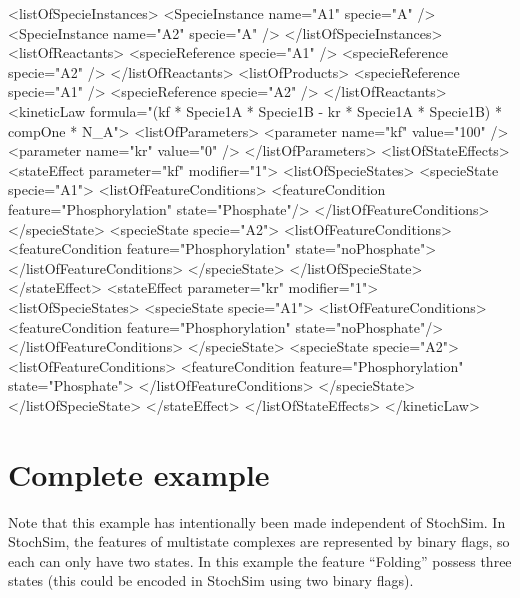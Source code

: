 \documentclass{cekarticle}
\begin{document}
\begin{example}
<listOfSpecieInstances>
    <SpecieInstance name="A1" specie="A" />
    <SpecieInstance name="A2" specie="A" />
</listOfSpecieInstances>
<listOfReactants>
    <specieReference specie="A1" />
    <specieReference specie="A2" />
</listOfReactants>
<listOfProducts>
    <specieReference specie="A1" />
    <specieReference specie="A2" />
</listOfReactants>
<kineticLaw formula="(kf * Specie1A * Specie1B - kr * Specie1A * Specie1B) * compOne * N_A">
    <listOfParameters>
        <parameter name="kf" value="100" />
        <parameter name="kr" value="0" />
    </listOfParameters>
    <listOfStateEffects>
        <stateEffect parameter="kf" modifier="1">
            <listOfSpecieStates>
                <specieState specie="A1">
                    <listOfFeatureConditions>
                        <featureCondition feature="Phosphorylation" state="Phosphate"/>
                    </listOfFeatureConditions>
                </specieState>
                <specieState specie="A2">
                    <listOfFeatureConditions>
                        <featureCondition feature="Phosphorylation" state="noPhosphate">
                    </listOfFeatureConditions>
                </specieState>
            </listOfSpecieState>
        </stateEffect>
         <stateEffect parameter="kr" modifier="1">
            <listOfSpecieStates>
                <specieState specie="A1">
                    <listOfFeatureConditions>
                        <featureCondition feature="Phosphorylation" state="noPhosphate"/>
                    </listOfFeatureConditions>
                </specieState>
                <specieState specie="A2">
                    <listOfFeatureConditions>
                        <featureCondition feature="Phosphorylation" state="Phosphate">
                    </listOfFeatureConditions>
                </specieState>
            </listOfSpecieState>
        </stateEffect>
    </listOfStateEffects>
</kineticLaw>
\end{example}


\section{Complete example}\label{sec:completeexample}

Note that this example has intentionally been made independent of
StochSim. In StochSim, the features of multistate complexes are
represented by binary flags, so each can only have two states. In this
example the feature ``Folding'' possess three states (this could be
encoded in StochSim using two binary flags).
\end{document}
